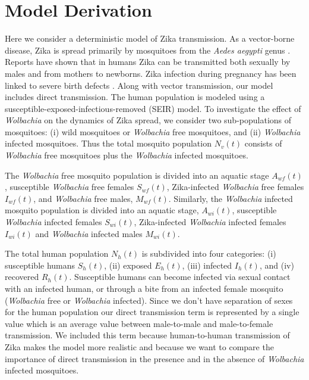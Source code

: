 \documentclass{ws-rv9x6}
\begin{document}
\section{Model Derivation}
Here we consider a deterministic model of Zika transmission. As a vector-borne disease, Zika is spread primarily by mosquitoes from the \textit{Aedes aegypti} genus \cite{chang2016zika}. Reports have shown that in humans Zika can be transmitted both sexually by males \cite{foy2011probable} and from mothers to newborns. Zika infection during pregnancy has been linked to severe birth defects \cite{tabata2016zika}. Along with vector transmission, our model includes direct transmission. The human population is modeled using a susceptible-exposed-infectious-removed (SEIR) model. To investigate the effect of \textit{Wolbachia} on the dynamics of Zika spread, we consider two sub-populations of mosquitoes: (i) wild mosquitoes or \textit{Wolbachia} free mosquitoes, and (ii) \textit{Wolbachia} infected mosquitoes.  Thus the total mosquito population $N_v(t)$ consists of \textit{Wolbachia} free mosquitoes plus the \textit{Wolbachia} infected mosquitoes.

The \textit{Wolbachia} free mosquito population is divided into an aquatic stage $A_{wf}(t)$, susceptible \textit{Wolbachia} free females $S_{wf}(t)$, Zika-infected \textit{Wolbachia} free females $I_{wf}(t)$, and \textit{Wolbachia} free males, $M_{wf}(t)$. Similarly, the \textit{Wolbachia} infected mosquito population is divided into an aquatic stage, $A_{wi}(t)$, susceptible \textit{Wolbachia} infected females $S_{wi}(t)$, Zika-infected \textit{Wolbachia} infected females $I_{wi}(t)$ and \textit{Wolbachia} infected males $M_{wi}(t)$.

The total human population $N_h(t)$ is subdivided into four categories: (i) susceptible humans $S_h(t)$, (ii) exposed $E_h(t)$, (iii) infected $I_h(t)$, and (iv) recovered $R_h(t)$. Susceptible humans can become infected via sexual contact with an infected human, or through a bite from an infected female mosquito (\textit{Wolbachia} free or \textit{Wolbachia} infected). Since we don't have separation of sexes for the human population our direct transmission term is represented by a single value which is an average value between male-to-male and male-to-female transmission. We included this term because human-to-human transmission of Zika makes the model more realistic and because we want to compare the importance of direct transmission in the presence and in the absence of \textit{Wolbachia} infected mosquitoes.
\end{document}

